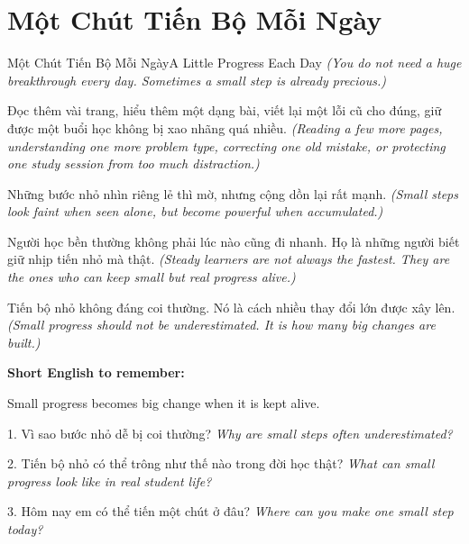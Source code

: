 \section{Một Chút Tiến Bộ Mỗi Ngày}
\begin{truyen}{Một Chút Tiến Bộ Mỗi Ngày}{A Little Progress Each Day}
\textit{(You do not need a huge breakthrough every day. Sometimes a small step is already precious.)}

Đọc thêm vài trang, hiểu thêm một dạng bài, viết lại một lỗi cũ cho đúng, giữ được một buổi học không bị xao nhãng quá nhiều.
\textit{(Reading a few more pages, understanding one more problem type, correcting one old mistake, or protecting one study session from too much distraction.)}

Những bước nhỏ nhìn riêng lẻ thì mờ, nhưng cộng dồn lại rất mạnh.
\textit{(Small steps look faint when seen alone, but become powerful when accumulated.)}

Người học bền thường không phải lúc nào cũng đi nhanh. Họ là những người biết giữ nhịp tiến nhỏ mà thật.
\textit{(Steady learners are not always the fastest. They are the ones who can keep small but real progress alive.)}
\end{truyen}

\begin{baihoc}
Tiến bộ nhỏ không đáng coi thường. Nó là cách nhiều thay đổi lớn được xây lên.
\textit{(Small progress should not be underestimated. It is how many big changes are built.)}
\end{baihoc}

\begin{ghinhoanh}
\textbf{Short English to remember:}

Small progress becomes big change when it is kept alive.

\end{ghinhoanh}

\begin{tuhocnhanh}
1. Vì sao bước nhỏ dễ bị coi thường? \textit{Why are small steps often underestimated?}

2. Tiến bộ nhỏ có thể trông như thế nào trong đời học thật? \textit{What can small progress look like in real student life?}

3. Hôm nay em có thể tiến một chút ở đâu? \textit{Where can you make one small step today?}
\end{tuhocnhanh}
\ngancach

